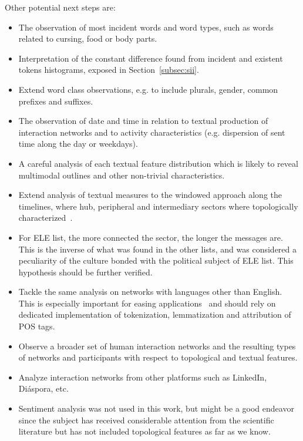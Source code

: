 Other potential next steps are:
\begin{itemize}
    \item The observation of most incident words and word types,
	    such as words related to cursing, food or body parts.
    \item Interpretation of the constant difference found from incident and existent tokens histograms,
	    exposed in Section~\ref{subsec:sii}.
    \item Extend word class observations, e.g. to include plurals, gender, common prefixes and suffixes.
    \item The observation of date and time in relation to textual production of interaction networks and
	    to activity characteristics (e.g. dispersion of sent time along the day or weekdays).
    \item A careful analysis of each textual feature distribution which is likely to reveal multimodal outlines and other non-trivial characteristics.
    \item Extend analysis of textual measures to the windowed approach along the timelines, where hub, peripheral and intermediary sectors where topologically characterized~\cite{evoSN}.
    \item For ELE list, the more connected the sector, the longer the messages are.
	    This is the inverse of what was found in the other lists,
	    and was considered a peculiarity of the culture bonded with the political subject of ELE list.
	    This hypothesis should be further verified.
    \item Tackle the same analysis on networks with languages other than English.
	    This is especially important for easing applications~\cite{ensaio}
	    and should rely on dedicated implementation of 
	    tokenization, lemmatization and attribution of POS tags.
    \item Observe a broader set of human interaction networks and the resulting types
	    of networks and participants with respect to topological and textual features.
    \item Analyze interaction networks from other platforms such as LinkedIn, Diáspora, etc.
    \item Sentiment analysis was not used in this work, but might be a good endeavor since the subject has received considerable attention from the scientific literature but has not included topological features as far as we know.
\end{itemize}
 
